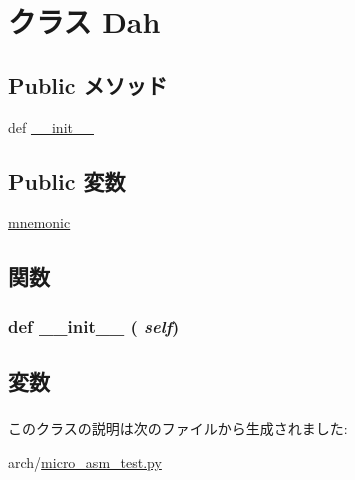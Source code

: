 \hypertarget{classmicro__asm__test_1_1Dah}{
\section{クラス Dah}
\label{classmicro__asm__test_1_1Dah}
}
\subsection*{Public メソッド}
\begin{DoxyCompactItemize}
\item 
def \hyperlink{classmicro__asm__test_1_1Dah_ac775ee34451fdfa742b318538164070e}{\_\-\_\-init\_\-\_\-}
\end{DoxyCompactItemize}
\subsection*{Public 変数}
\begin{DoxyCompactItemize}
\item 
\hyperlink{classmicro__asm__test_1_1Dah_aaf1ad8da0f374cbd19a0a177d5280477}{mnemonic}
\end{DoxyCompactItemize}


\subsection{関数}
\hypertarget{classmicro__asm__test_1_1Dah_ac775ee34451fdfa742b318538164070e}{
\subsubsection[{\_\-\_\-init\_\-\_\-}]{\setlength{\rightskip}{0pt plus 5cm}def \_\-\_\-init\_\-\_\- ( {\em self})}}
\label{classmicro__asm__test_1_1Dah_ac775ee34451fdfa742b318538164070e}



\begin{DoxyCode}
46                       :
47         self.mnemonic = "dah"
48 
microops = {
\end{DoxyCode}


\subsection{変数}
\hypertarget{classmicro__asm__test_1_1Dah_aaf1ad8da0f374cbd19a0a177d5280477}{
\subsubsection[{mnemonic}]{}}
\label{classmicro__asm__test_1_1Dah_aaf1ad8da0f374cbd19a0a177d5280477}


このクラスの説明は次のファイルから生成されました:\begin{DoxyCompactItemize}
\item 
arch/\hyperlink{micro__asm__test_8py}{micro\_\-asm\_\-test.py}\end{DoxyCompactItemize}
